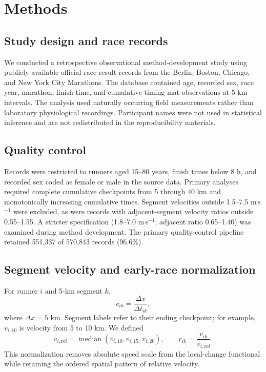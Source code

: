 \documentclass[pdflatex,sn-basic]{sn-jnl}
\begin{document}
\section{Methods}

\subsection{Study design and race records}
We conducted a retrospective observational method-development study using publicly available official race-result records from the Berlin, Boston, Chicago, and New York City Marathons. The database contained age, recorded sex, race year, marathon, finish time, and cumulative timing-mat observations at 5-km intervals. The analysis used naturally occurring field measurements rather than laboratory physiological recordings. Participant names were not used in statistical inference and are not redistributed in the reproducibility materials.

\subsection{Quality control}
Records were restricted to runners aged 15--80 years, finish times below 8 h, and recorded sex coded as female or male in the source data. Primary analyses required complete cumulative checkpoints from 5 through 40 km and monotonically increasing cumulative times. Segment velocities outside 1.5--7.5 m\,s$^{-1}$ were excluded, as were records with adjacent-segment velocity ratios outside 0.55--1.55. A stricter specification (1.8--7.0 m\,s$^{-1}$; adjacent ratio 0.65--1.40) was examined during method development. The primary quality-control pipeline retained 551,337 of 570,843 records (96.6\%).

\subsection{Segment velocity and early-race normalization}
For runner $i$ and 5-km segment $k$,
\begin{equation}
v_{ik}=\frac{\Delta x}{\Delta t_{ik}},
\end{equation}
where $\Delta x=5$ km. Segment labels refer to their ending checkpoint; for example, $v_{i,10}$ is velocity from 5 to 10 km. We defined
\begin{equation}
v_{i,\mathrm{ref}}=\operatorname{median}(v_{i,10},v_{i,15},v_{i,20}),
\qquad
r_{ik}=\frac{v_{ik}}{v_{i,\mathrm{ref}}}.
\end{equation}
This normalization removes absolute speed scale from the local-change functional while retaining the ordered spatial pattern of relative velocity.
\end{document}
